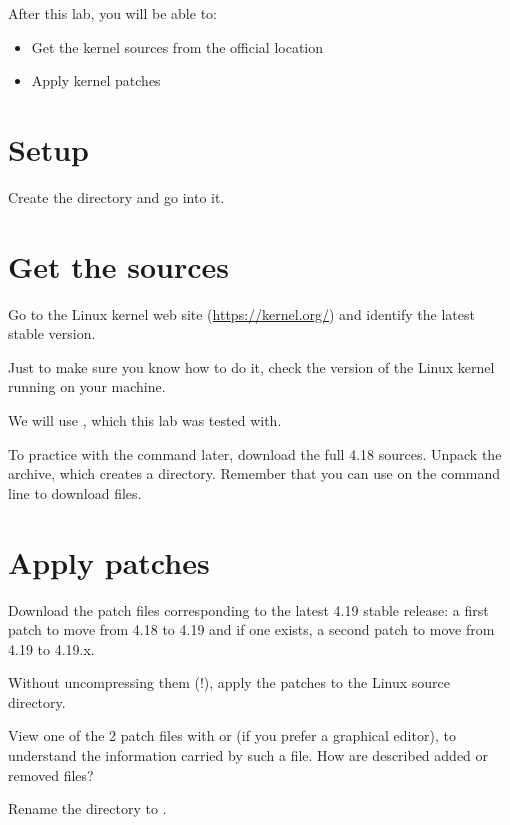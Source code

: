 
After this lab, you will be able to:
\begin{itemize}
\item Get the kernel sources from the official location
\item Apply kernel patches
\end{itemize}

\section{Setup}

Create the  directory and go into it.

\section{Get the sources}

Go to the Linux kernel web site (\url{https://kernel.org/}) and
identify the latest stable version.

Just to make sure you know how to do it, check the version of the
Linux kernel running on your machine.

We will use , which this lab was tested with.

To practice with the  command later, download the full 4.18
sources. Unpack the archive, which creates a 
directory. Remember that you can use  on the command
line to download files.

\section{Apply patches}

Download the patch files corresponding to the latest 4.19 stable
release: a first patch to move from 4.18 to 4.19 and if one exists,
a second patch to move from 4.19 to 4.19.x.

Without uncompressing them (!), apply the patches to the Linux
source directory.

View one of the 2 patch files with  or 
(if you prefer a graphical editor), to understand the information carried
by such a file. How are described added or removed files?

Rename the  directory to .
